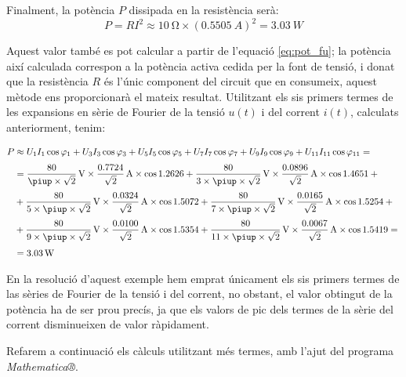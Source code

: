 \begin{exemple}
    Finalment, la potència $P$ dissipada en la resistència serà:
    \[
        P = R I^2 \approx \SI{10}{\ohm} \times (\SI{0,5505}{A})^2 =
        \SI{3,03}{W}
    \]

    Aquest valor també es pot calcular a partir de l'equació
    \eqref{eq:pot_fu}; la potència així calculada correspon a la
    potència activa cedida per la font de tensió, i donat que la
    resistència $R$ és l'únic component del circuit que en consumeix,
    aquest mètode ens proporcionarà el mateix resultat. Utilitzant els sis primers termes  de les
    expansions en sèrie de Fourier de la tensió $u(t)$ i del corrent
    $i(t)$, calculats anteriorment, tenim:

    \[\begin{split}
        P &\approx U_1 I_1 \cos\varphi_1 +  U_3 I_3 \cos\varphi_3 +
         U_5 I_5 \cos\varphi_5 + U_7 I_7 \cos\varphi_7 +
         U_9 I_9 \cos\varphi_9 + U_{11} I_{11} \cos\varphi_{11} = {}\\[0.7ex]
        &= \frac{80}{\piup\times\sqrt{2}}\unit{V} \times
        \frac{\num{0,7724}}{\sqrt{2}}\unit{A} \times \cos \num{1,2626} +
        \frac{80}{3\times\piup\times\sqrt{2}}\unit{V} \times
        \frac{\num{0,0896}}{\sqrt{2}}\unit{A} \times \cos \num{1,4651} + {} \\[0.7ex]
        &+ \frac{80}{5\times\piup\times\sqrt{2}}\unit{V} \times
        \frac{\num{0,0324}}{\sqrt{2}}\unit{A} \times \cos \num{1,5072} +
        \frac{80}{7\times\piup\times\sqrt{2}}\unit{V} \times
        \frac{\num{0,0165}}{\sqrt{2}}\unit{A} \times \cos \num{1,5254} + {}\\[0.7ex]
        &+ \frac{80}{9\times\piup\times\sqrt{2}}\unit{V} \times
        \frac{\num{0,0100}}{\sqrt{2}}\unit{A} \times \cos \num{1,5354} +
        \frac{80}{11\times\piup\times\sqrt{2}}\unit{V} \times
        \frac{\num{0,0067}}{\sqrt{2}}\unit{A} \times \cos \num{1,5419}= {}\\[0.7ex]
        &= \SI{3,03}{W}
    \end{split}\]

    En la resolució d'aquest exemple hem emprat únicament els sis
    primers termes de las sèries de Fourier de la tensió i del corrent,
    no obstant, el valor  obtingut de la potència ha de ser prou precís, ja que
    els valors de pic dels termes de la sèrie del corrent disminueixen de
    valor ràpidament.

    Refarem a continuació els càlculs utilitzant més termes, amb l'ajut
    del programa
    \emph{Mathematica®}.   


\end{exemple}
